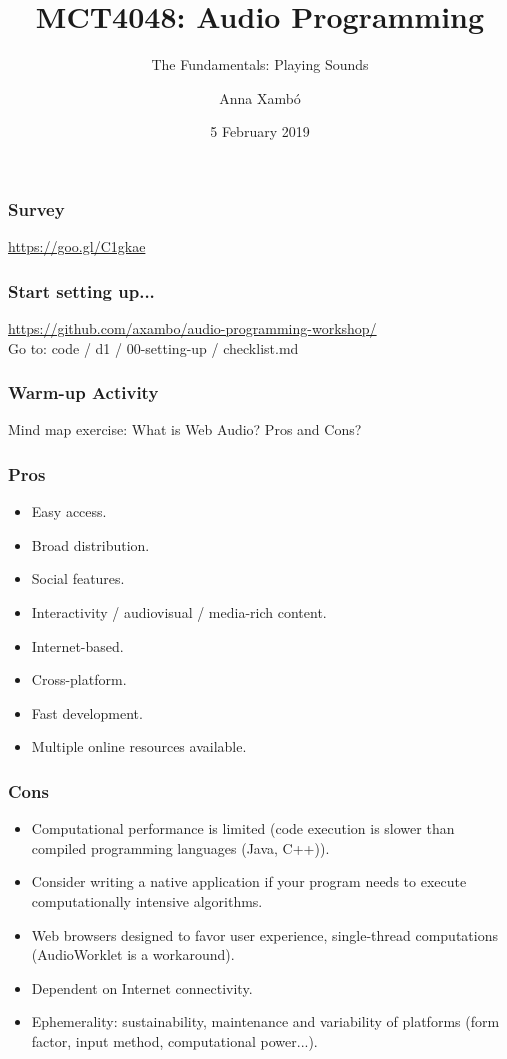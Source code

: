 \documentclass[screen, aspectratio=43]{beamer}
\title[AP-intro]{MCT4048: Audio Programming}
\subtitle{The Fundamentals: Playing Sounds}
\author[A. Xamb{\'o}]{Anna Xamb{\'o}}
\institute[NTNU]{Department of Music, NTNU}
\date{5 February 2019}
\begin{document}
\begin{frame}
  \titlepage
\end{frame}


\begin{frame}
\frametitle{Survey}
\url{https://goo.gl/C1gkae}
\end{frame}

\begin{frame}
\frametitle{Start setting up...}
\url{https://github.com/axambo/audio-programming-workshop/} 
\\
Go to: code / d1 / 00-setting-up / checklist.md

\end{frame}

\begin{frame}
\frametitle{Warm-up Activity}
Mind map exercise: What is Web Audio? Pros and Cons?
\end{frame}

\begin{frame}
\frametitle{Pros}
\begin{itemize}
\item Easy access.
\item Broad distribution.
\item Social features.
\item Interactivity / audiovisual / media-rich content.
\item Internet-based.
\item Cross-platform.
\item Fast development.
\item Multiple online resources available.
\end{itemize}
\end{frame}

\begin{frame}
\frametitle{Cons}
\begin{itemize}
\item Computational performance is limited (code execution is slower than compiled programming languages (Java, C++)).
\item Consider writing a native application if your program needs to execute computationally intensive algorithms.
\item Web browsers designed to favor user experience, single-thread computations (AudioWorklet is a workaround).
\item Dependent on Internet connectivity.
\item Ephemerality: sustainability, maintenance and variability of platforms (form factor, input method, computational power...).
\end{itemize}
\end{frame}
\end{document}
